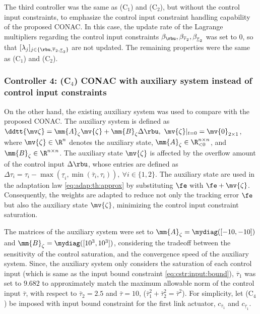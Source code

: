 \documentclass[lettersize,journal]{IEEEtran}
\begin{document}
The third controller was the same as (C$_1$) and (C$_2$), but without the control input constraints, to emphasize the control input constraint handling capability of the proposed CONAC.
In this case, the update rate of the Lagrange multipliers regarding the control input constraints \ie $\beta_{\rbu},\beta_{\overline{\tau}_2},\beta_{\underline{\tau}_2}$ was set to $0$, so that $[\lambda_j]_{j\in\{\rbu,\overline{\tau}_2,\underline{\tau}_2\}}$ are not updated.
The remaining properties were the same as (C$_1$) and (C$_2$).

\subsubsection*{Controller 4: (C$_4$) CONAC with auxiliary system instead of control input constraints}

On the other hand, the existing auxiliary system \cite{Esfandiari:2014aa,Karason:1994aa,Esfandiari:2015aa} was used to compare with the proposed CONAC.
The auxiliary system is defined as $\ddtt{\mv\zeta} = \mm{A}_\zeta \mv{\zeta} + \mm{B}_\zeta \Delta\rbu,\ \mv{\zeta}\vert_{t=0} = \mv{0}_{2\times1}$, where $\mv{\zeta}\in\R^n$ denotes the auxiliary state, $\mm{A}_\zeta\in\R_{<0}^{n\times n}$, and $\mm{B}_\zeta\in\R^{n\times n}$.
The auxiliary state $\mv{\zeta}$ is affected by the overflow amount of the control input $\Delta\rbu$, whose entries are defined as $\Delta\tau_{i} = 
\tau_{i}-\max(\underline\tau_i,\min(\overline\tau_i,\tau_i)),\ \forall i\in\{1,2\}$.
The auxiliary state are used in the adaptation law \eqref{eq:adap:th:approx} by substituting $\fe$ with $\fe+\mv{\zeta}$.
Consequently, the weights are adapted to reduce not only the tracking error $\fe$ but also the auxiliary state $\mv{\zeta}$, minimizing the control input constraint saturation.

The matrices of the auxiliary system were set to $\mm{A}_\zeta=\mydiag([-10,-10])$ and $\mm{B}_\zeta=\mydiag([10^3,10^3])$, considering the tradeoff between the sensitivity of the control saturation, and the convergence speed of the auxiliary system.
Since, the auxiliary system only considers the saturation of each control input (\ie which is same as the input bound constraint \eqref{eq:cstr:input:bound}), $\overline{\tau}_1$ was set to $9.682$ to approximately match the maximum allowable norm of the control input $\overline\tau$, with respect to $\overline{\tau}_2=2.5$ and $\overline{\tau}=10$, (\ie $\overline{\tau}_1^2+\overline{\tau}_2^2=\overline{\tau}^2$).
For simplicity, let (C$_4$) be imposed with input bound constraint for the first link actuator, \ie $c_{\overline{\tau}_1}$ and $c_{\underline{\tau}_1}$.
\end{document}
